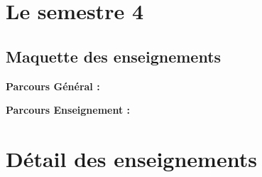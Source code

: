 \documentclass[10pt, a5paper]{report}
\begin{document}
\begin{spacing}{1.5}
\footnotesize

\section*{Le semestre 4}

\subsection*{Maquette des enseignements}

\textbf{Parcours Général :}
\newline



\newpage
\textbf{Parcours Enseignement :}
\newline


\section*{Détail des enseignements}

\end{spacing}
\end{document}

